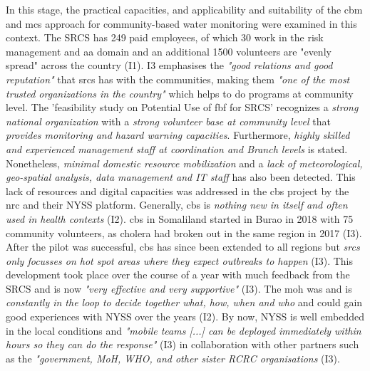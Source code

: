 In this stage, the practical capacities, and applicability and suitability of the \acrshort*{cbm} and \acrshort*{mcs} approach for community-based water monitoring were examined in this context. The SRCS has 249 paid employees, of which 30 work in the risk management and \acrlong*{aa} domain and an additional 1500 volunteers are "evenly spread" across the country (I1). I3 emphasises the \textit{"good relations and good reputation"} that \acrshort*{srcs} has with the communities, making them \textit{"one of the most trusted organizations in the country"} which helps to do programs at community level. The 'feasibility study on Potential Use of \acrshort*{fbf} for SRCS' \autocite[44]{somaliredcrescentsocietyFeasibilityStudyPotential2022} recognizes a \textit{strong national organization} with a \textit{strong volunteer base at community level} that \textit{provides monitoring and hazard warning capacities}. Furthermore, \textit{highly skilled and experienced management staff at coordination and Branch levels} is stated. Nonetheless, \textit{minimal domestic resource mobilization} and a \textit{lack of meteorological, geo-spatial analysis, data management and IT staff} has also been detected.
This lack of resources and digital capacities was addressed in the \acrshort*{cbs} project by the \acrshort*{nrc} and their NYSS platform. Generally, \acrshort{cbs} is \textit{nothing new in itself and often used in health contexts} (I2). \acrshort*{cbs} in Somaliland started in Burao in 2018 with 75 community volunteers, as cholera had broken out in the same region in 2017 (I3). After the pilot was successful, \acrshort*{cbs} has since been extended to all regions but \textit{\acrshort*{srcs} only focusses on hot spot areas where they expect outbreaks to happen} (I3). This development took place over the course of a year with much feedback from the SRCS and is now \textit{"very effective and very supportive"} (I3). The \acrfull*{moh} was and is \textit{constantly in the loop to decide together what, how, when and who} and could gain good experiences with NYSS over the years (I2). By now, NYSS is well embedded in the local conditions and \textit{"mobile teams [...] can be deployed immediately within hours so they can do the response"} (I3) in collaboration with other partners such as the \textit{"government, MoH, WHO, and other sister RCRC organisations} (I3).\newline
